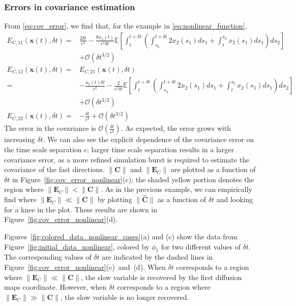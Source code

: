 \subsubsection{Errors in covariance estimation}

From \eqref{eq:cov_error}, we find that, for the example in \eqref{eq:nonlinear_function},
%
\begin{equation}
\begin{aligned}
E_{C,11} (\mathbf{x}(t), \delta t)
=&
\frac{2 \delta t}{\epsilon^2}
- \frac{8 x_2(t)}{\epsilon^2 \delta t} \mathbb{E} \left[ \int_t^{t+\delta t} \left( \int_{s_2}^{t+\delta t} 2 x_2(s_1) ds_1
+  \int_t^{s_2} x_2(s_1) ds_1 \right) ds_2\right]  \\ &+ \mathcal{O} (\delta t^{3/2}) \\
E_{C, 12} (\mathbf{x}(t), \delta t)
= &
E_{C, 21} (\mathbf{x}(t), \delta t)\\
=&
- \frac{x_2(t) \delta t}{\epsilon^2}
- \frac{2}{\epsilon^2 \delta t} \mathbb{E} \left[ \int_t^{t+\delta t} \left( \int_{s_2}^{t + \delta t} 2 x_2(s_1) ds_1 + \int_t^{s_2} x_2(s_1) ds_1 \right) ds_2 \right] \\ &+ \mathcal{O} (\delta t^{3/2})\\
E_{C, 22} (\mathbf{x}(t), \delta t)
=&
-\frac{\delta t}{\epsilon^2} + \mathcal{O} (\delta t^{3/2})
\end{aligned}
\end{equation}
%
The error in the covariance is $\mathcal{O} \left( \frac{\delta t}{\epsilon^2} \right)$.
%
As expected, the error grows with increasing $\delta t$.
%
We can also see the explicit dependence of the covariance error on the time scale separation $\epsilon$; larger time scale separation results in a larger covariance error, as a more refined simulation burst is required to estimate the covariance of the fast directions.
%
$\|\mathbf{C} \|$ and $\| \mathbf{E}_C\|  $ are plotted as a function of $\delta t$ in Figure~\ref{fig:cov_error_nonlinear}(c); the shaded yellow portion denotes the region where $\| \mathbf{E}_C \| < \| \mathbf{C} \|$.
%
As in the previous example, we can empirically find where $\| \mathbf{E}_C \| \ll \| \mathbf{C} \|$  by plotting $\| \hat{\mathbf{C}} \|$ as a function of $\delta t $ and looking for a knee in the plot.
%
These results are shown in Figure~\ref{fig:cov_error_nonlinear}(d).

Figures~\ref{fig:colored_data_nonlinear_cases}(a) and (c) show the data from Figure~\ref{fig:initial_data_nonlinear}, colored by $\phi_1$ for two different values of $\delta t$.
%
The corresponding values of $\delta t$ are indicated by the dashed lines in Figure~\ref{fig:cov_error_nonlinear}(c)~and~(d).
%
When $\delta t$ corresponds to a region where $\|\mathbf{E}_C \| \ll \| \mathbf{C} \|$, the slow variable is recovered by the first diffusion maps coordinate.
%
However, when $\delta t$ corresponds to a region where $\|\mathbf{E}_C \| \gg \| \mathbf{C} \|$, the slow variable is no longer recovered.



